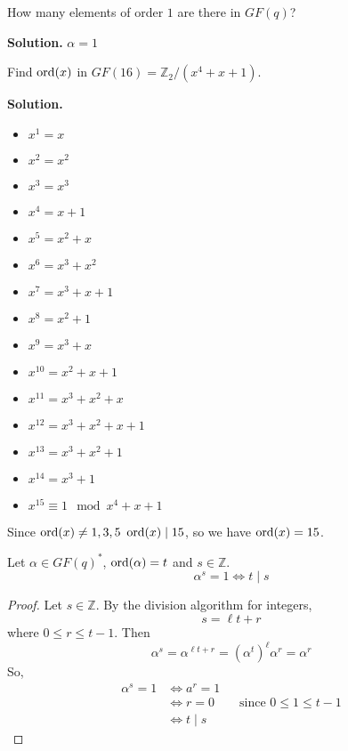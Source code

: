 \begin{exbox}
    \begin{example}
        How many elements of order $ 1 $ are there in $ GF(q) $?

        \textbf{Solution.} $ \alpha=1 $
    \end{example}
\end{exbox}

\begin{exbox}
    \begin{example}
        Find $ \operatorname{ord}(x) $ in $ GF(16)=\mathbb{Z}_2/(x^4+x+1) $.

        \textbf{Solution.}
        \begin{itemize}
            \item $ x^1=x $
            \item $ x^2=x^2 $
            \item $ x^3=x^3 $
            \item $ x^4=x+1 $
            \item $ x^5=x^2+x $
            \item $ x^6=x^3+x^2 $
            \item $ x^7=x^3+x+1 $
            \item $ x^8=x^2+1 $
            \item $ x^9=x^3+x $
            \item $ x^{10}=x^2+x+1 $
            \item $ x^{11}=x^3+x^2+x $
            \item $ x^{12}=x^3+x^2+x+1 $
            \item $ x^{13}=x^3+x^2+1 $
            \item $ x^{14}=x^3+1 $
            \item $ x^15\equiv 1\mod x^4+x+1 $
        \end{itemize}
        Since $ \operatorname{ord}(x)\neq 1,3,5 $ $ \operatorname{ord}(x)\mid 15 $, so we have $ \operatorname{ord}(x)=15 $.
    \end{example}
\end{exbox}

\begin{thmbox}
    \begin{lemma}
        Let $ \alpha\in GF(q)^* $, $ \operatorname{ord}(\alpha)=t $ and $ s\in\mathbb{Z} $.
        \[ \alpha^s=1\iff t\mid s \]
    \end{lemma}
\end{thmbox}

\begin{proof}
    Let $ s\in\mathbb{Z} $. By the division algorithm for integers, 
    \[ s=\ell t+r \]
    where $ 0\leqslant r\leqslant t-1 $. Then
    \[ \alpha^s=\alpha^{\ell t+r}=(\alpha^t)^\ell \alpha^r=\alpha^r \]
    So,
    \begin{align*}
        \alpha^s=1 & \iff a^r=1                                             \\
                   & \iff r=0 \qquad\text{since } 0\leqslant 1\leqslant t-1 \\
                   & \iff t\mid s
    \end{align*}
\end{proof}

